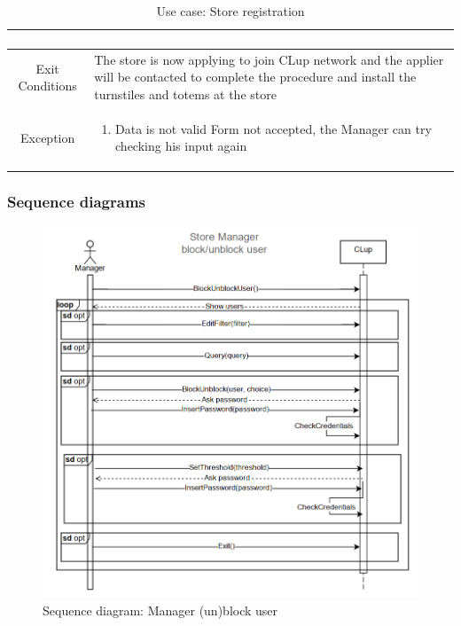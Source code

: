 \begin{enumerate}
\begin{table}[H]
{\begin{tabular}{|c|p{14cm}|}
\begin{enumerate}
			\end{enumerate}\\
			
			\hline
			Exit Conditions & The store is now applying to join CLup network and the applier will be contacted to complete the procedure and install the turnstiles and totems at the store\\
			\hline
			
			Exception & \begin{enumerate}
				\item Data is not valid\newline
				Form not accepted, the Manager can try checking his input again
				
				
			\end{enumerate}\\
			
			\hline
		\end{tabular}
	}
	\caption{Use case: Store registration}
	\label{tab: UCStoreReg}
\end{table}

\end{enumerate}



\subsubsection{Sequence diagrams}
\begin{figure}[H]
	\includegraphics[width=\linewidth]{../Diagrams/BlockUser.png}
	\caption{Sequence diagram: Manager (un)block user}
	\label{fig:BlockUser}
\end{figure}


